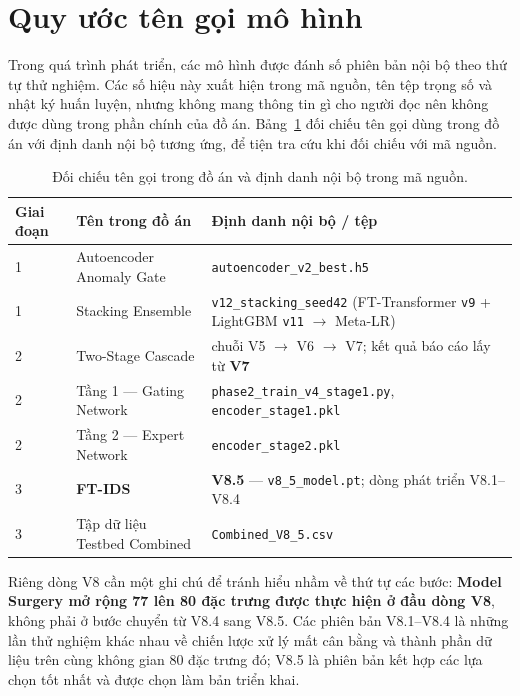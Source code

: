 \documentclass[../DoAn.tex]{subfiles}
\begin{document}
\section{Quy ước tên gọi mô hình}
\label{sec:plb-naming}

Trong quá trình phát triển, các mô hình được đánh số phiên bản nội bộ theo thứ tự thử nghiệm. Các số hiệu này xuất hiện trong mã nguồn, tên tệp trọng số và nhật ký huấn luyện, nhưng không mang thông tin gì cho người đọc nên không được dùng trong phần chính của đồ án. Bảng~\ref{tab:model-naming} đối chiếu tên gọi dùng trong đồ án với định danh nội bộ tương ứng, để tiện tra cứu khi đối chiếu với mã nguồn.

\begin{table}[H]
    \centering
    \caption{Đối chiếu tên gọi trong đồ án và định danh nội bộ trong mã nguồn.}
    \label{tab:model-naming}
    \begin{tabular}{llp{5.2cm}}
        \hline
        \textbf{Giai đoạn} & \textbf{Tên trong đồ án} & \textbf{Định danh nội bộ / tệp} \\
        \hline
        1 & Autoencoder Anomaly Gate & \texttt{autoencoder\_v2\_best.h5} \\
        1 & Stacking Ensemble & \texttt{v12\_stacking\_seed42} (FT-Transformer \texttt{v9} + LightGBM \texttt{v11} $\to$ Meta-LR) \\
        2 & Two-Stage Cascade & chuỗi V5 $\to$ V6 $\to$ V7; kết quả báo cáo lấy từ \textbf{V7} \\
        2 & \quad Tầng 1 --- Gating Network & \texttt{phase2\_train\_v4\_stage1.py}, \texttt{encoder\_stage1.pkl} \\
        2 & \quad Tầng 2 --- Expert Network & \texttt{encoder\_stage2.pkl} \\
        3 & \textbf{FT-IDS} & \textbf{V8.5} --- \texttt{v8\_5\_model.pt}; dòng phát triển V8.1--V8.4 \\
        3 & Tập dữ liệu Testbed Combined & \texttt{Combined\_V8\_5.csv} \\
        \hline
    \end{tabular}
\end{table}

Riêng dòng V8 cần một ghi chú để tránh hiểu nhầm về thứ tự các bước: \textbf{Model Surgery mở rộng 77 lên 80 đặc trưng được thực hiện ở đầu dòng V8}, không phải ở bước chuyển từ V8.4 sang V8.5. Các phiên bản V8.1--V8.4 là những lần thử nghiệm khác nhau về chiến lược xử lý mất cân bằng và thành phần dữ liệu trên cùng không gian 80 đặc trưng đó; V8.5 là phiên bản kết hợp các lựa chọn tốt nhất và được chọn làm bản triển khai.
\end{document}
